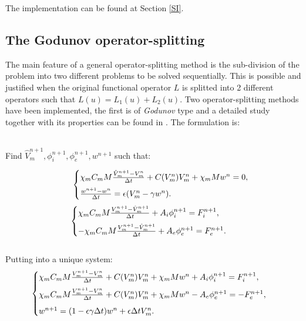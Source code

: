 \documentclass[a4paper,11pt]{article}
\begin{document}
\noindent The implementation can be found at Section \ref{SI}.

\subsection{The Godunov operator-splitting}
The main feature of a general operator-splitting method is the sub-division of the problem into two different problems to be solved sequentially. This is possible and justified when the original functional operator $L$ is splitted into 2 different operators such that $L(u)=L_1(u)+L_2(u)$.
Two operator-splitting methods have been implemented, the first is of \emph{Godunov} type and a detailed study together with its properties can be found in \cite{spiteri}. The formulation is: \\ \\
\begin{center}Find $\hat{V}_m^{n+1},\phi_i^{n+1},\phi_e^{n+1},w^{n+1}$ such that:\end{center}
\begin{equation*} \hspace{10mm}
\begin{cases}
\chi_m C_m M\frac{\hat{V}_m^{n+1} - V_m^n}{\Delta t} + C(V_m^n)V_m^n +\chi_mMw^n = 0,\vspace{2mm}\\
\frac{w^{n+1}-w^n}{\Delta t} = \epsilon (V_m^n - \gamma w^n).
\end{cases}
\end{equation*}
\vspace{3mm}
\begin{equation*}
\begin{cases}
\chi_m C_m M\frac{V_m^{n+1} - \hat{V}_m^{n+1}}{\Delta t} + A_i\phi_i^{n+1} = F_i^{n+1}, \vspace{2mm}\\
-\chi_m C_m M\frac{V_m^{n+1} - \hat{V}_m^{n+1}}{\Delta t} + A_e\phi_e^{n+1} = F_e^{n+1}.
\end{cases}
\end{equation*}
\vspace{3mm} \\
\noindent Putting into a unique system:
\begin{equation}\label{Godunov}
\begin{cases}
\chi_m C_m M\frac{V_m^{n+1} - V_m^n}{\Delta t} + C(V_m^n)V_m^n +\chi_mMw^n + A_i \phi_i^{n+1}= F_i^{n+1}, \vspace{2mm}\\
\chi_m C_m M\frac{V_m^{n+1} - V_m^n}{\Delta t} + C(V_m^n)V_m^n +\chi_mMw^n - A_e \phi_e^{n+1}= -F_e^{n+1}, \vspace{2mm}\\
w^{n+1} = (1-\epsilon \gamma \Delta t) w^n + \epsilon \Delta t V_m^n.
\end{cases}
\end{equation} \vspace{3mm} \\
\end{document}
